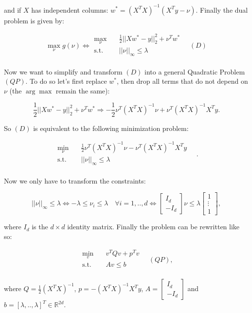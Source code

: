 \documentclass[a4paper, 12pt]{article}
\begin{document}
	and if $X$ has independent columns: $w^* = (X^TX)^{-1}(X^Ty-\nu).$ Finally the dual problem is given by:
	
	$$ \max_{\nu} g(\nu) \Longleftrightarrow 
	\begin{aligned}
	\max_{\nu} \quad & \frac{1}{2}||Xw^* - y||_2^2 + \nu^Tw^*\\
	\textrm{s.t.} \quad & ||\nu||_{\infty} \leq \lambda\\
	\end{aligned} \quad (D)$$
	
	Now we want to simplify and transform $(D)$ into a general Quadratic Problem $(QP)$. To do so let's first replace $w^*$, then drop all terms that do not depend on $\nu$ (the $\arg\max$ remain the same):
	
	$$\frac{1}{2}||Xw^* - y||_2^2 + \nu^Tw^* \Longrightarrow -\frac{1}{2}\nu^T(X^TX)^{-1}\nu + \nu^T(X^TX)^{-1}X^Ty.$$
	
	\newpage
	
	So $(D)$ is equivalent to the following minimization problem:
	
	$$\begin{aligned}
	\min_{\nu} \quad & \frac{1}{2}\nu^T(X^TX)^{-1}\nu - \nu^T(X^TX)^{-1}X^Ty\\
	\textrm{s.t.} \quad & ||\nu||_{\infty} \leq \lambda\\
	\end{aligned} \quad.$$
	
	Now we only have to transform the constraints:
	
	$$||\nu||_{\infty} \leq \lambda \Longleftrightarrow -\lambda \leq \nu_i \leq \lambda \quad \forall i=1,..,d \Longleftrightarrow \begin{bmatrix} I_d \\ -I_d \end{bmatrix}\nu \leq \lambda \begin{bmatrix} 1 \\ \vdots \\ 1 \end{bmatrix},$$
	
	where $I_d$ is the $d\times d$ identity matrix. Finally the problem can be rewritten like so:
	
	$$\begin{aligned}
	\min_{v} \quad & v^TQv + p^Tv\\
	\textrm{s.t.} \quad & Av \leq b\\
	\end{aligned} \quad (QP),$$
	
	where $Q=\frac{1}{2}(X^TX)^{-1}$, $p = -(X^TX)^{-1}X^Ty$, $A=\begin{bmatrix} I_d \\ -I_d \end{bmatrix}$ and $b=[\lambda,..,\lambda]^T \in \mathbb{R}^{2d}$.
	
	
\end{document}
